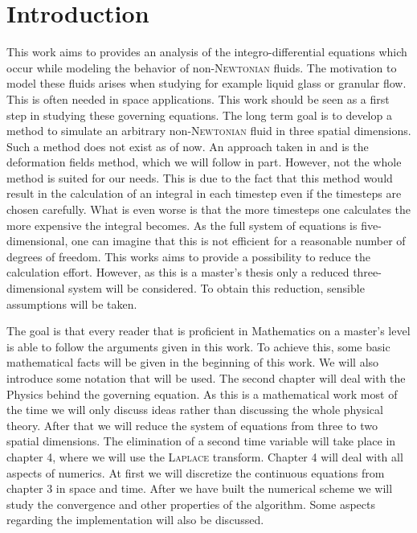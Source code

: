 \documentclass[12pt,a4paper,twoside, open=right]{scrreprt}
\theoremstyle{definition}
\theoremstyle{plain}
\begin{document}
\chapter{Introduction}
This work aims to provides an analysis of the integro-differential equations which occur while modeling the behavior of non-\textsc{Newtonian} fluids. The motivation to model these fluids arises when studying for example liquid glass or granular flow. This is often needed in space applications. This work should be seen as a first step in studying these governing equations. The long term goal is to develop a method to simulate an arbitrary non-\textsc{Newtonian} fluid in three spatial dimensions. Such a method does not exist as of now. An approach taken in \cite{Hulsen2001} and \cite{Hulsen2018} is the deformation fields method, which we will follow in part. However, not the whole method is suited for our needs. This is due to the fact that this method would result in the calculation of an integral in each timestep even if the timesteps are chosen carefully. What is even worse is that the more timesteps one calculates the more expensive the integral becomes. As the full system of equations is five-dimensional, one can imagine that this is not efficient for a reasonable number of degrees of freedom. This works aims to provide a possibility to reduce the calculation effort. However, as this is a master's thesis only a reduced three-dimensional system will be considered. To obtain this reduction, sensible assumptions will be taken.
\\
\par 
The goal is that every reader that is proficient in Mathematics on a master's level is able to follow the arguments given in this work. To achieve this, some basic mathematical facts will be given in the beginning of this work. We will also introduce some notation that will be used. The second chapter will deal with the Physics behind the governing equation. As this is a mathematical work most of the time we will only discuss ideas rather than discussing the whole physical theory. After that we will reduce the system of equations from three to two spatial dimensions. The elimination of a second time variable will take place in chapter 4, where we will use the \textsc{Laplace} transform. Chapter 4 will deal with all aspects of numerics. At first we will discretize the continuous equations from chapter 3 in space and time. After we have built the numerical scheme we will study the convergence and other properties of the algorithm. Some aspects regarding the implementation will also be discussed.\\
\end{document}
